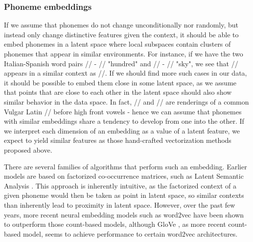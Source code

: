 \documentclass[6pt]{article}
\begin{document}
\subsubsection{Phoneme embeddings}
\label{Phoneme embeddings}



If we assume that phonemes do not change unconditionally nor randomly, but instead only change distinctive features given the context, it should be able to embed phonemes in a latent space where local subspaces contain clusters of phonemes that appear in similar environments. For instance, if we have the two Italian-Spanish word pairs // - // "hundred" and  // - // "sky", we see that // appears in a similar context as //. If we should find more such cases in our data, it should be possible to embed them close in some latent space, as we assume that points that are close to each other in the latent space should also show similar behavior in the data space. In fact, // and // are renderings of a common Vulgar Latin // before high front vowels - hence we can assume that phonemes with similar embeddings share a tendency to develop from one into the other. If we interpret each dimension of an embedding as a value of a latent feature, we expect to yield similar features as those hand-crafted vectorization methods proposed above.



There are several families of algorithms that perform such an embedding. Earlier models are based on factorized co-occurrence matrices, such as Latent Semantic Analysis \citep{landauer2013handbook}. This approach is inherently intuitive, as the factorized context of a given phoneme would then be taken as point in latent space, so similar contexts than inherently lead to proximity in latent space. However, over the past few years, more recent neural embedding models such as word2vec \citep{mikolov2013efficient,mikolov2013distributed,goldberg2014word2vec}  have been shown to outperform those count-based models, although GloVe \citep{pennington2014glove}, as more recent count-based model, seems to achieve performance to certain word2vec architectures.
\end{document}
